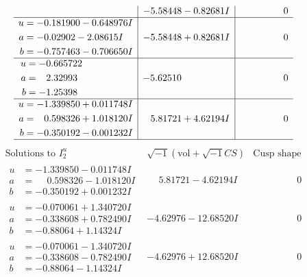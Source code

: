 \documentclass[1p]{elsarticle_modified}
\theoremstyle{definition}
\newcommand{\I}{\sqrt{-1}}
\begin{document}
$$\begin{array}{c|c|c}
 & -5.58448 - 0.82681 I & \phantom{-0.000000 } 0 \\ \hline\begin{aligned}
u &= -0.181900 - 0.648976 I \\
a &= -0.02902 - 2.08615 I \\
b &= -0.757463 - 0.706650 I\end{aligned}
 & -5.58448 + 0.82681 I & \phantom{-0.000000 } 0 \\ \hline\begin{aligned}
u &= -0.665722\phantom{ +0.000000I} \\
a &= \phantom{-}2.32993\phantom{ +0.000000I} \\
b &= -1.25398\phantom{ +0.000000I}\end{aligned}
 & -5.62510\phantom{ +0.000000I} & \phantom{-0.000000 } 0 \\ \hline\begin{aligned}
u &= -1.339850 + 0.011748 I \\
a &= \phantom{-}0.598326 + 1.018120 I \\
b &= -0.350192 - 0.001232 I\end{aligned}
 & \phantom{-}5.81721 + 4.62194 I & \phantom{-0.000000 } 0\\
 \hline 
 \end{array}$$\newpage$$\begin{array}{c|c|c}  
\text{Solutions to }I^u_{2}& \I (\text{vol} + \sqrt{-1}CS) & \text{Cusp shape}\\
 \hline 
\begin{aligned}
u &= -1.339850 - 0.011748 I \\
a &= \phantom{-}0.598326 - 1.018120 I \\
b &= -0.350192 + 0.001232 I\end{aligned}
 & \phantom{-}5.81721 - 4.62194 I & \phantom{-0.000000 } 0 \\ \hline\begin{aligned}
u &= -0.070061 + 1.340720 I \\
a &= -0.338608 + 0.782490 I \\
b &= -0.88064 + 1.14324 I\end{aligned}
 & -4.62976 - 12.68520 I & \phantom{-0.000000 } 0 \\ \hline\begin{aligned}
u &= -0.070061 - 1.340720 I \\
a &= -0.338608 - 0.782490 I \\
b &= -0.88064 - 1.14324 I\end{aligned}
 & -4.62976 + 12.68520 I & \phantom{-0.000000 } 0 \\ \hline\begin{aligned}

\end{aligned}
\end{array}$$
\end{document}
